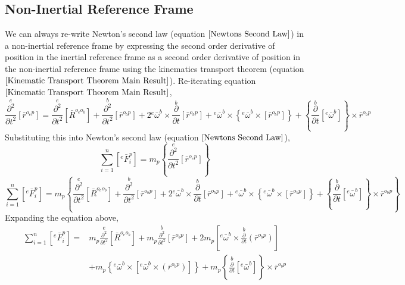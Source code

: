 \subsection{Non-Inertial Reference Frame} 
\label{non-inertial ref frame newtons second law point particle}
\begin{comment}
\end{comment}
We can always re-write Newton's second law (equation $\ref{Newtons Second Law}$) in a non-inertial reference frame by expressing the second order derivative of position in the inertial reference frame as a second order derivative of position in the non-inertial reference frame using the kinematics transport theorem (equation $\ref{Kinematic Transport Theorem Main Result}$).
Re-iterating equation $\ref{Kinematic Transport Theorem Main Result}$,
\begin{equation}
\overset{e}{\frac{\partial^{2}}{\partial t^{2}}}[\bar{r}^{o_{e}p}] =
\overset{e}{\frac{\partial^{2}}{\partial t^{2}}}[\bar{R}^{o_{e}o_{b}}]     
+ \overset{b}{\frac{\partial^{2}}{\partial t^{2}}}[\bar{r}^{o_{b}p}] 
+ 2{}^{e}\bar{\omega}^{b}\times\overset{b}{\frac{\partial}{\partial t}}[\bar{r}^{o_{b}p}]
+ {}^{e}\bar{\omega}^{b}\times\left\{{}^{e}\bar{\omega}^{b}\times\left[\bar{r}^{o_{b}p}\right]\right\}    
+ \left\{\overset{b}{\frac{\partial}{\partial t}}[{}^{e}\bar{\omega}^{b}]\right\}\times\bar{r}^{o_{b}p}
\end{equation}
Substituting this into Newton's second law (equation $\ref{Newtons Second Law}$),
$$\sum^{n}_{i = 1}\left[{}^{e}\bar{F}^{p}_{i}\right] = m_{p}\left\{\overset{e}{\frac{\partial^{2}}{\partial t^{2}}}[\bar{r}^{o_{e}p}]\right\}$$
$$\sum^{n}_{i = 1}\left[{}^{e}\bar{F}^{p}_{i}\right] = m_{p}\left\{ \overset{e}{\frac{\partial^{2}}{\partial t^{2}}}[\bar{R}^{o_{e}o_{b}}]     
+ \overset{b}{\frac{\partial^{2}}{\partial t^{2}}}[\bar{r}^{o_{b}p}] 
+ 2{}^{e}\bar{\omega}^{b}\times\overset{b}{\frac{\partial}{\partial t}}[\bar{r}^{o_{b}p}]
+ {}^{e}\bar{\omega}^{b}\times\left\{{}^{e}\bar{\omega}^{b}\times\left[\bar{r}^{o_{b}p}\right]\right\}    
+ \left\{\overset{b}{\frac{\partial}{\partial t}}[{}^{e}\bar{\omega}^{b}]\right\}\times\bar{r}^{o_{b}p} \right\}$$
Expanding the equation above,
\begin{align*}
\sum^{n}_{i = 1}\left[{}^{e}\bar{F}^{p}_{i}\right] = &m_{p}\overset{e}{\frac{\partial^{2}}{\partial t^{2}}}[\bar{R}^{o_{e}o_{b}}]     
+ m_{p}\overset{b}{\frac{\partial^{2}}{\partial t^{2}}}[\bar{r}^{o_{b}p}] 
+ 2m_{p}\left[{}^{e}\bar{\omega}^{b}\times\overset{b}{\frac{\partial}{\partial t}}(\bar{r}^{o_{b}p})\right] \\ 
& + m_{p}\left\{{}^{e}\bar{\omega}^{b}\times\left[{}^{e}\bar{\omega}^{b}\times\left(\bar{r}^{o_{b}p}\right)\right]\right\}    
+ m_{p}\left\{\overset{b}{\frac{\partial}{\partial t}}[{}^{e}\bar{\omega}^{b}]\right\}\times\bar{r}^{o_{b}p}
\end{align*}
